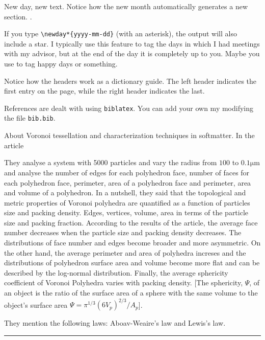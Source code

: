 \documentclass[a4paper, 11pt, oneside]{researchjournal} %
\begin{document}
 New day, new text. Notice how the new month automatically generates a new section. 
\daybib\cite{wald1984GeneralRelativity}.

 If you type \verb|\newday*{yyyy-mm-dd}| (with an asterisk), the output will also include a star. I typically use this feature to tag the days in which I had meetings with my advisor, but at the end of the day it is completely up to you. Maybe you use to tag happy days or something. 

 Notice how the headers work as a dictionary guide. The left header indicates the first entry on the page, while the right header indicates the last. 

 References are dealt with using \verb|biblatex|. You can add your own my modifying the file \verb|bib.bib|.

 About Voronoi tessellation and characterization techniques in softmatter.
In the article \cite{yangVoronoiTessellationPacking2002} 

They analyse a system with 5000 particles and vary the radius from $100$ to $0.1\mathrm{\mu m}$ and analyse the number of edges for each polyhedron face, number of faces for each polyhedron face, perimeter, area of a polyhedron face and perimeter, area and volume of a polyhedron.
In a nutshell, they said that the topological and metric properties of Voronoi polyhedra are quantified as a function of particles size and packing density.
Edges, vertices, volume, area in terms of the particle size and packing fraction.
According to the results of the article, the average face number decreases when the particle size and packing density decreases.
The distributions of face number and edges become broader and more asymmetric.
On the other hand, the average perimeter and area of polyhedra increses and the distributions of polyhedron surface area and volume become more flat and can be described by the log-normal distribution.
Finally, the average sphericity coefficient of Voronoi Polyhedra varies with packing density.
[The sphericity, $ \Psi $, of an object is the ratio of the surface area of a sphere with the same volume to the object's surface area $\Psi=\pi^{1/3}\left(6V_{p}\right)^{2/3}/A_{p}$].

They mention the following laws: Aboav-Weaire's law and Lewis's law.


\rule{\textwidth}{0.4pt}
\end{document}
